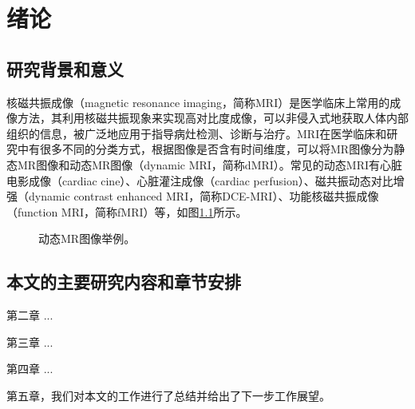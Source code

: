 \chapter{绪论}
\label{chap:introduction}

\section{研究背景和意义}
核磁共振成像\cite{mrireview}（magnetic resonance imaging，简称MRI）是医学临床上常用的成像方法，其利用核磁共振现象来实现高对比度成像，可以非侵入式地获取人体内部组织的信息，被广泛地应用于指导病灶检测、诊断与治疗\cite{lustig2006}。MRI在医学临床和研究中有很多不同的分类方式，根据图像是否含有时间维度，可以将MR图像分为静态MR图像和动态MR图像（dynamic MRI，简称dMRI）。常见的动态MRI有心脏电影成像（cardiac cine）、心脏灌注成像（cardiac perfusion）、磁共振动态对比增强（dynamic contrast enhanced MRI，简称DCE-MRI）、功能核磁共振成像（function MRI，简称fMRI）等，如图\ref{fig:dynamic}所示。
\begin{figure}[htbp]
\centering
{}
\centering
\caption{动态MR图像举例。}
\label{fig:dynamic}
\end{figure}

\section{本文的主要研究内容和章节安排}

第二章 ...

第三章 ...

第四章 ...

第五章，我们对本文的工作进行了总结并给出了下一步工作展望。





